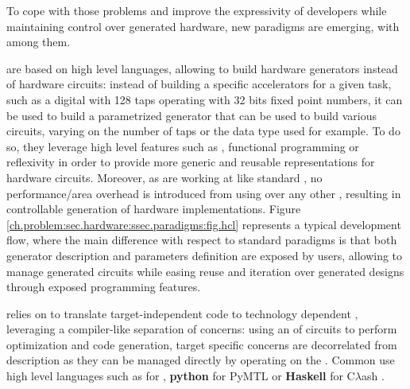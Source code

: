         To cope with those problems and improve the expressivity of developers while maintaining control over generated hardware, new paradigms are emerging, with  among them.

         are based on high level languages, allowing to build hardware generators instead of hardware circuits: instead of building a specific accelerators for a given task, such as a digital  with 128 taps operating with 32 bits fixed point numbers, it can be used to build a parametrized  generator that can be used to build various circuits, varying on the number of taps or the data type used for example. 
        To do so, they leverage high level features such as , functional programming or reflexivity in order to provide more generic and reusable representations for hardware circuits.
        Moreover, as  are working at  like standard , no performance/area overhead is introduced from using  over any other  \cite{izraelevitz_2017_reusability}, resulting in controllable generation of hardware implementations.
        Figure \ref{ch.problem:sec.hardware:ssec.paradigms:fig.hcl} represents a typical  development flow, where the main difference with respect to standard paradigms is that both generator description and parameters definition are exposed by users, allowing to manage generated circuits while easing reuse and iteration over generated designs through exposed programming features.

         relies on  to translate target-independent  code to technology dependent , leveraging a compiler-like separation of concerns: using an  of circuits to perform optimization and code generation, target specific concerns are decorrelated from  description as they can be managed directly by operating on the .
        Common  use high level languages such as \scala{} for  \cite{bachrach_chisel_2012}, {\bf python} for PyMTL \cite{lockhart_pymtl_2014} or {\bf Haskell} for C$\lambda$ash \cite{baaij_clash_2010}.

